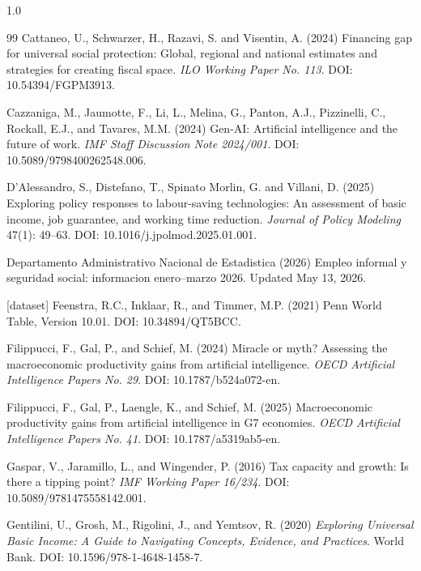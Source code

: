 \documentclass[11pt,a4paper]{article}
\begin{document}
\begin{spacing}{1.0}
\begin{thebibliography}{99}
Cattaneo, U., Schwarzer, H., Razavi, S. and Visentin, A. (2024)
\newblock Financing gap for universal social protection: Global, regional and national estimates and strategies for creating fiscal space.
\newblock \emph{ILO Working Paper No. 113}. DOI: 10.54394/FGPM3913.

Cazzaniga, M., Jaumotte, F., Li, L., Melina, G., Panton, A.J., Pizzinelli, C., Rockall, E.J., and Tavares, M.M. (2024)
\newblock Gen-AI: Artificial intelligence and the future of work.
\newblock \emph{IMF Staff Discussion Note 2024/001}. DOI: 10.5089/9798400262548.006.

D'Alessandro, S., Distefano, T., Spinato Morlin, G. and Villani, D. (2025)
\newblock Exploring policy responses to labour-saving technologies: An assessment of basic income, job guarantee, and working time reduction.
\newblock \emph{Journal of Policy Modeling} 47(1): 49--63. DOI: 10.1016/j.jpolmod.2025.01.001.


Departamento Administrativo Nacional de Estadistica (2026)
\newblock Empleo informal y seguridad social: informacion enero--marzo 2026.
\newblock Updated May 13, 2026.

[dataset] Feenstra, R.C., Inklaar, R., and Timmer, M.P. (2021)
\newblock Penn World Table, Version 10.01.
\newblock DOI: 10.34894/QT5BCC.

Filippucci, F., Gal, P., and Schief, M. (2024)
\newblock Miracle or myth? Assessing the macroeconomic productivity gains from artificial intelligence.
\newblock \emph{OECD Artificial Intelligence Papers No. 29}. DOI: 10.1787/b524a072-en.


Filippucci, F., Gal, P., Laengle, K., and Schief, M. (2025)
\newblock Macroeconomic productivity gains from artificial intelligence in G7 economies.
\newblock \emph{OECD Artificial Intelligence Papers No. 41}. DOI: 10.1787/a5319ab5-en.


Gaspar, V., Jaramillo, L., and Wingender, P. (2016)
\newblock Tax capacity and growth: Is there a tipping point?
\newblock \emph{IMF Working Paper 16/234}. DOI: 10.5089/9781475558142.001.

Gentilini, U., Grosh, M., Rigolini, J., and Yemtsov, R. (2020)
\newblock \emph{Exploring Universal Basic Income: A Guide to Navigating Concepts, Evidence, and Practices}.
\newblock World Bank. DOI: 10.1596/978-1-4648-1458-7.



\end{thebibliography}
\end{spacing}
\end{document}
